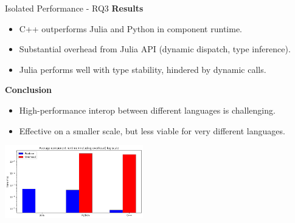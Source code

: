 \begin{frame}{Isolated Performance - RQ3}
        \textbf{Results}
        \begin{itemize}
            \item C++ outperforms Julia and Python in component runtime.
            \item Substantial overhead from Julia API (dynamic dispatch, type inference).
            \item Julia performs well with type stability, hindered by dynamic calls.
        \end{itemize}
        \pause
        \textbf{Conclusion}
        \begin{itemize}
            \item High-performance interop between different languages is challenging.
            \item Effective on a smaller scale, but less viable for very different languages.
        \end{itemize}
    \begin{center}
        \includegraphics[width=0.45\textwidth]{assets/time-and-overhead-log.png} %
    \end{center}
\end{frame}